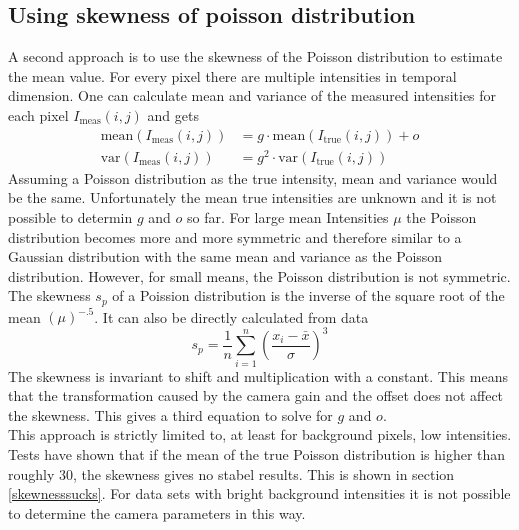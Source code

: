 \subsection{Using skewness of poisson distribution}
A second approach is to use the skewness of the Poisson distribution to estimate the mean value.\newline
For every pixel there are multiple intensities in temporal dimension. One can
calculate mean and variance of the measured intensities for each pixel $I_\text{meas}(i,j)$ and
gets
\begin{align}
	\text{mean}(I_\text{meas}(i,j))& = g\cdot \text{mean}(I_\text{true}(i,j)) + o \label{meanvarPoiss1}\\
	\text{var}(I_\text{meas}(i,j))& = g^2\cdot\text{var}(I_\text{true}(i,j)) \label{meanvarPoiss2}
\end{align}
Assuming a Poisson distribution as the true intensity, mean and variance would
be the same. Unfortunately the mean true intensities are unknown and it is
not possible to determin $g$ and $o$ so far. For large mean Intensities $\mu$
the Poisson distribution becomes more and more symmetric and therefore similar to a Gaussian distribution
with the same mean and variance as the Poisson distribution. However, for small means, the Poisson distribution is not
symmetric. The skewness $s_p$ of a Poission distribution is the inverse of the
square root of the mean $(\mu)^{-.5}$. It can also be directly
calculated from data
\begin{equation}
	s_p = \frac{1}{n}\sum_{i = 1}^n \left(\frac{x_i - \bar x}{\sigma}\right)^3
\end{equation}
The skewness is invariant to shift and multiplication with a constant. This
means that the transformation caused by the camera gain and the offset
does not affect the skewness. This gives a third equation to solve for $g$ and
$o$.\\
This approach is strictly limited to, at least for background pixels, low intensities. Tests have shown that if the mean of the true Poisson distribution is higher than roughly 30, the skewness gives no stabel results. This is shown in section \ref{skewnesssucks}. For data sets with bright background intensities it is not possible to determine the camera parameters in this way.

